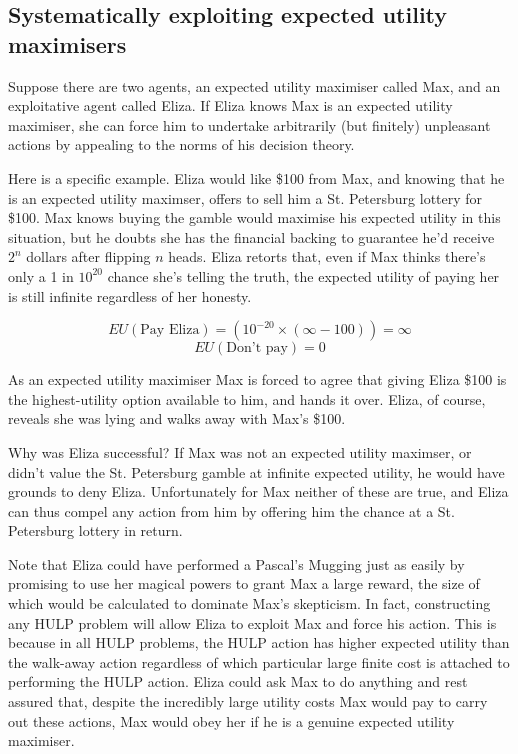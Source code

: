 \documentclass{article}
\begin{document}
\subsection{Systematically exploiting expected utility maximisers}

Suppose there are two agents, an expected utility maximiser called Max, and an exploitative agent called Eliza. If Eliza knows Max is an expected utility maximiser, she can force him to undertake arbitrarily (but finitely) unpleasant actions by appealing to the norms of his decision theory. 

Here is a specific example. Eliza would like \$100 from Max, and knowing that he is an expected utility maximser, offers to sell him a St. Petersburg lottery for \$100. Max knows buying the gamble would maximise his expected utility in this situation, but he doubts she has the financial backing to guarantee he'd receive \(2^n\) dollars after flipping \(n\) heads. Eliza retorts that, even if Max thinks there's only a 1 in \(10^{20}\) chance she's telling the truth, the expected utility of paying her is still infinite regardless of her honesty.

\[EU(\mbox{Pay Eliza})=(10^{-20}\times(\infty-100)) = \infty\]
\[EU(\mbox{Don't pay})=0\]

As an expected utility maximiser Max is forced to agree that giving Eliza \$100 is the highest-utility option available to him, and hands it over. Eliza, of course, reveals she was lying and walks away with Max's \$100.

Why was Eliza successful? If Max was not an expected utility maximser, or didn't value the St. Petersburg gamble at infinite expected utility, he would have grounds to deny Eliza. Unfortunately for Max neither of these are true, and Eliza can thus compel any action from him by offering him the chance at a St. Petersburg lottery in return. 

Note that Eliza could have performed a Pascal's Mugging just as easily by promising to use her magical powers to grant Max a large reward, the size of which would be calculated to dominate Max's skepticism. In fact, constructing any HULP problem will allow Eliza to exploit Max and force his action. This is because in all HULP problems, the HULP action has higher expected utility than the walk-away action regardless of which particular large finite cost is attached to performing the HULP action. Eliza could ask Max to do anything and rest assured that, despite the incredibly large utility costs Max would pay to carry out these actions, Max would obey her if he is a genuine expected utility maximiser.
\end{document}
